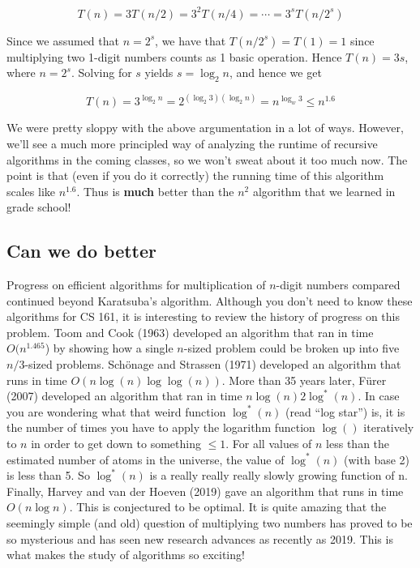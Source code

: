 \documentclass [12pt]{article}
\begin{document}
$$
T(n) = 3T(n/2) = 3^2T(n/4) = \cdots = 3^sT(n/2^s)
$$

Since we assumed that $n = 2^s$, we have that $T(n/2^s) = T(1) = 1$ since multiplying two 1-digit
numbers counts as 1 basic operation. Hence $T(n) = 3s$, where $n = 2^s$. Solving for $s$ yields
$s = \log_2 n$, and hence we get

$$
T(n) = 3^{\log_2 n} = 2^{(\log_2 3)(\log_2 n)} = n^{\log_w 3} \leq n^{1.6}
$$

We were pretty sloppy with the above argumentation in a lot of ways. However, we’ll see a much more principled way of analyzing the runtime of recursive algorithms in the coming classes, so we won’t sweat about it too much now. The point is that (even if you do it correctly) the running time of this algorithm scales like $n^{1.6}$. Thus is \textbf{much} better than the $n^2$ algorithm that we learned in grade school!

\subsection{Can we do better}

Progress on efficient algorithms for multiplication of $n$-digit numbers compared continued beyond Karatsuba's algorithm. Although you don’t need to know these algorithms for CS 161, it is interesting to review the history of progress on this problem. Toom and Cook (1963) developed an algorithm that ran in time $O(n^{1.465}$) by showing how a single $n$-sized problem could be broken up into five $n/3$-sized problems. Schönage and Strassen (1971) developed an algorithm that runs in time $O(n \log(n) \log \log(n))$. More than 35 years later, Fürer (2007) developed an algorithm that ran in time $n \log(n)2\log^*(n)$. In case you are wondering what that weird function $\log^*(n)$ (read “log star”) is, it is the number of times you have to apply the logarithm function $\log()$ iteratively to $n$ in order to get down to something $\leq 1$. For all values of $n$ less than the estimated number of atoms in the universe, the value of $\log^*(n)$ (with base 2) is less than 5. So $\log^*(n)$ is a really really really slowly growing function of n. Finally, Harvey and van der Hoeven (2019) gave an algorithm that runs in time $O(n \log n)$. This is conjectured to be optimal. It is quite amazing that the seemingly simple (and old) question of multiplying two numbers has proved to be so mysterious and has seen new research advances as recently as 2019. This is what makes the study of algorithms so exciting!
\end{document}
